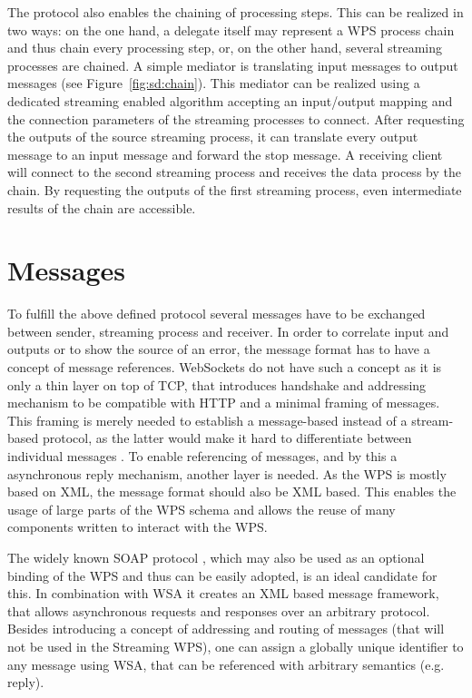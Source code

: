 		The protocol also enables the chaining of processing steps. This can be realized in two ways: on the one hand, a delegate itself may represent a \ac{WPS} process chain and thus chain every processing step, or, on the other hand, several streaming processes are chained. A simple mediator is translating input messages to output messages (see Figure~\ref{fig:sd:chain}). This mediator can be realized using a dedicated streaming enabled algorithm accepting an input/output mapping and the connection parameters of the streaming processes to connect. After requesting the outputs of the source streaming process, it can translate every output message to an input message and forward the stop message. A receiving client will connect to the second streaming process and receives the data process by the chain. By requesting the outputs of the first streaming process, even intermediate results of the chain are accessible.

	\section{Messages}
		\label{sec:streaming:messages}
		To fulfill the above defined protocol several messages have to be exchanged between sender, streaming process and receiver. In order to correlate input and outputs or to show the source of an error, the message format has to have a concept of message references. WebSockets do not have such a concept as it is only a thin layer on top of TCP, that introduces handshake and addressing mechanism to be compatible with HTTP and a minimal framing of messages. This framing is merely needed to establish a message-based instead of a stream-based protocol, as the latter would make it hard to differentiate between individual messages \citep{ietf:rfc6455}. To enable referencing of messages, and by this a asynchronous reply mechanism, another layer is needed. As the \ac{WPS} is mostly based on \ac{XML}, the message format should also be \ac{XML} based. This enables the usage of large parts of the \ac{WPS} schema and allows the reuse of many components written to interact with the \ac{WPS}.

		The widely known SOAP protocol \citep{w3c:soap1}, which may also be used as an optional binding of the \ac{WPS} \citep{ogc:wps} and thus can be easily adopted, is an ideal candidate for this. In combination with \ac{WSA} \citep{w3c:wsa} it creates an \ac{XML} based message framework, that allows asynchronous requests and responses over an arbitrary protocol. Besides introducing a concept of addressing and routing of messages (that will not be used in the Streaming \ac{WPS}), one can assign a globally unique identifier to any message using \ac{WSA}, that can be referenced with arbitrary semantics (e.g. reply).

